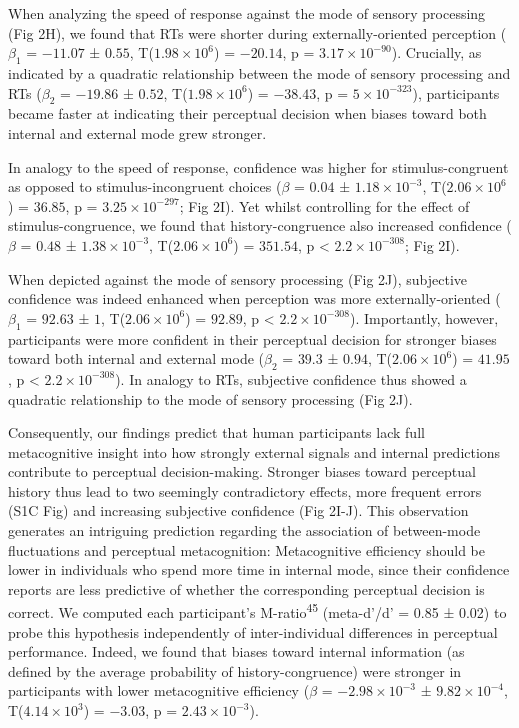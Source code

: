 \documentclass[
]{article}
\begin{document}
When analyzing the speed of response against the mode of sensory
processing (Fig 2H), we found that RTs were shorter during
externally-oriented perception (\(\beta_1\) = \(-11.07\) ± \(0.55\),
T(\(\ensuremath{1.98\times 10^{6}}\)) = \(-20.14\), p =
\(\ensuremath{3.17\times 10^{-90}}\)). Crucially, as indicated by a
quadratic relationship between the mode of sensory processing and RTs
(\(\beta_2\) = \(-19.86\) ± \(0.52\),
T(\(\ensuremath{1.98\times 10^{6}}\)) = \(-38.43\), p =
\(\ensuremath{5\times 10^{-323}}\)), participants became faster at
indicating their perceptual decision when biases toward both internal
and external mode grew stronger.

In analogy to the speed of response, confidence was higher for
stimulus-congruent as opposed to stimulus-incongruent choices (\(\beta\)
= \(0.04\) ± \(\ensuremath{1.18\times 10^{-3}}\),
T(\(\ensuremath{2.06\times 10^{6}}\)) = \(36.85\), p =
\(\ensuremath{3.25\times 10^{-297}}\); Fig 2I). Yet whilst
controlling for the effect of stimulus-congruence, we found that
history-congruence also increased confidence (\(\beta\) = \(0.48\) ±
\(\ensuremath{1.38\times 10^{-3}}\),
T(\(\ensuremath{2.06\times 10^{6}}\)) = \(351.54\), p < \(\ensuremath{2.2\times 10^{-308}}\); Fig
2I).

When depicted against the mode of sensory processing (Fig 2J),
subjective confidence was indeed enhanced when perception was more
externally-oriented (\(\beta_1\) = \(92.63\) ± \(1\),
T(\(\ensuremath{2.06\times 10^{6}}\)) = \(92.89\), p < \(\ensuremath{2.2\times 10^{-308}}\)).
Importantly, however, participants were more confident in their
perceptual decision for stronger biases toward both internal and
external mode (\(\beta_2\) = \(39.3\) ± \(0.94\),
T(\(\ensuremath{2.06\times 10^{6}}\)) = \(41.95\), p < \(\ensuremath{2.2\times 10^{-308}}\)). In
analogy to RTs, subjective confidence thus showed a quadratic
relationship to the mode of sensory processing (Fig 2J).

Consequently, our findings predict that human participants lack full
metacognitive insight into how strongly external signals and internal
predictions contribute to perceptual decision-making. Stronger biases
toward perceptual history thus lead to two seemingly contradictory
effects, more frequent errors (S1C Fig) and increasing
subjective confidence (Fig 2I-J). This observation generates an
intriguing prediction regarding the association of between-mode
fluctuations and perceptual metacognition: Metacognitive efficiency
should be lower in individuals who spend more time in internal mode,
since their confidence reports are less predictive of whether the
corresponding perceptual decision is correct. We computed each
participant's M-ratio\textsuperscript{45} (meta-d'/d' = 0.85 ± 0.02) to
probe this hypothesis independently of inter-individual differences in
perceptual performance. Indeed, we found that biases toward internal
information (as defined by the average probability of
history-congruence) were stronger in participants with lower
metacognitive efficiency (\(\beta\) =
\(\ensuremath{-2.98\times 10^{-3}}\) ±
\(\ensuremath{9.82\times 10^{-4}}\),
T(\(\ensuremath{4.14\times 10^{3}}\)) = \(-3.03\), p =
\(\ensuremath{2.43\times 10^{-3}}\)).
\end{document}
